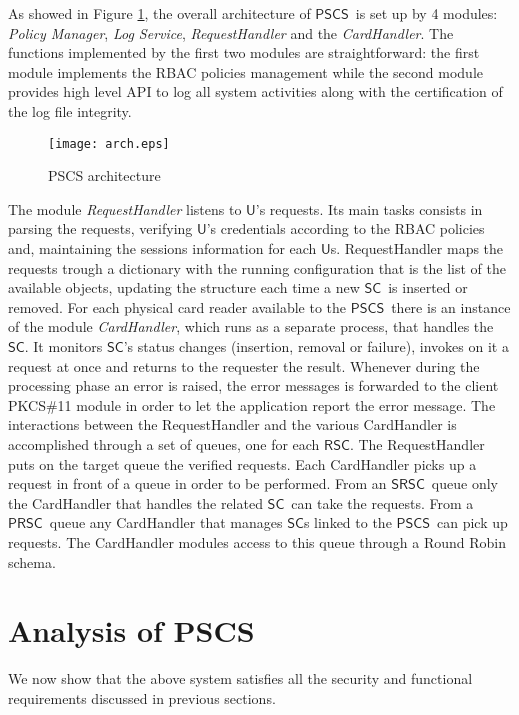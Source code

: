 \documentclass[preprint,authoryear,12pt]{elsarticle}
\newcommand{\User}{\ensuremath{\mathsf{U}}}
\newcommand{\SC}{\ensuremath{\mathsf{SC}}}
\newcommand{\RSC}{\ensuremath{\mathsf{RSC}}}
\newcommand{\SRSC}{\ensuremath{\mathsf{SRSC}}}
\newcommand{\PRSC}{\ensuremath{\mathsf{PRSC}}}
\newcommand{\PSCS}{\ensuremath{\mathsf{PSCS}}}
\begin{document}
As showed in Figure \ref{fig:architecture}, the overall architecture of \PSCS\ is set up by 4  modules: \emph{Policy Manager}, \emph{Log Service}, \emph{RequestHandler} and the \emph{CardHandler}. The functions implemented by the first two modules are straightforward: the first module implements the RBAC policies management while the second module provides high level API to log all system activities along with the certification of the log file integrity.

\begin{figure}
\centerline{\texttt{[image: arch.eps]}}
\caption{PSCS architecture} \label{fig:architecture}
\end{figure} 



The module \emph{RequestHandler} listens to \User 's requests. Its main tasks consists in parsing the requests, verifying \User 's credentials according to the RBAC policies and, maintaining the sessions information for each \User s. RequestHandler maps the requests trough a dictionary with the running configuration that is the list of the available objects, updating the structure each time a new \SC\ is inserted or removed.  For each physical card reader available to the \PSCS\ there is an instance of the module \emph{CardHandler}, which runs as a separate process, that handles the \SC . It monitors \SC's status changes (insertion, removal or failure), invokes on it a request at once and returns to the requester the result. Whenever during the processing phase an error is raised, the error messages is forwarded to the client PKCS\#11 module in order to let the application report the error message.  The interactions between the RequestHandler and the various CardHandler is accomplished through a set of queues, one for each \RSC . The RequestHandler puts on the target queue the verified requests. Each CardHandler picks up a request in front of a queue in order to be performed. From an \SRSC\ queue only the CardHandler that handles the related \SC\ can take the requests. From a \PRSC\ queue any CardHandler that manages  \SC s linked to the \PSCS\ can pick up requests. The CardHandler modules access to this queue through a Round Robin schema.



\section{Analysis of PSCS}
\label{analysis}
We now show that the above system satisfies all the security and functional requirements discussed in previous sections. 
\end{document}
